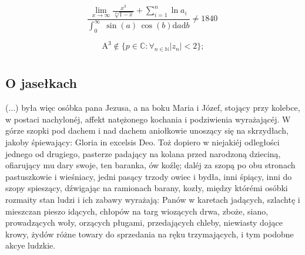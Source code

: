 \documentclass{book}
\begin{document}
\begin{equation}
    \frac{\lim_{x \rightarrow \infty} \frac{x^3}{\sqrt[15]{1 - x} } + \sum_{i=1}^n \ln a_i} {\int_0^{\infty} \; \sin (a) \, \cos (b) \mathrm{d}a \mathrm{d}b} \neq 1840 \;
    \label{eqn:data}
\end{equation}

\begin{equation}
    \text{A}^3 \notin \{p \in \mathbb{C} : \forall_{n \in \mathbb{N}} |z_n|<2 \};
    \label{eqn:krol}
\end{equation}

\chapter{}
\section{O jasełkach}
(...) była więc osóbka pana Jezusa, a na boku Maria i Józef, stojący przy kolebce, w postaci nachylonéj, affekt natężonego kochania i podziwienia wyrażającéj. W górze szopki pod dachem i nad dachem aniołkowie unoszący się na skrzydłach, jakoby śpiewający: Gloria in excelsis Deo. Toż dopiero w niejakiéj odległości jednego od drugiego, pasterze padający na kolana przed narodzoną dzieciną, ofiarujący mu dary swoje, ten baranka, ów koźlę; daléj za szopą po obu stronach pastuszkowie i wieśniacy, jedni pasący trzody owiec i bydła, inni śpiący, inni do szopy spieszący, dźwigając na ramionach barany, kozły, między którémi osóbki rozmaity stan ludzi i ich zabawy wyrażają: Panów w karetach jadących, szlachtę i mieszczan pieszo idących, chłopów na targ wiozących drwa, zboże, siano, prowadzących woły, orzących pługami, przedających chleby, niewiasty dojące krowy, żydów różne towary do sprzedania na ręku trzymających, i tym podobne akcye ludzkie.
\end{document}
